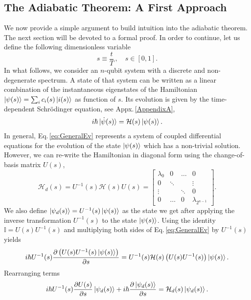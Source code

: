 \subsection{The Adiabatic Theorem: A First Approach}
We now provide a simple argument to build intuition into the adiabatic theorem. The next section will be devoted to a formal proof. In order to continue, let us define the following dimensionless variable
\begin{equation}
    s \equiv \frac{t}{T}\, , \quad s \in [0,1].
\end{equation}
In what follows, we consider an $n$-qubit system with a discrete and non-degenerate spectrum. A state of that system can be written as a linear combination of the instantaneous eigenstates of the Hamiltonian $\ket{\psi(s)} = \sum_{i}c_{i}(s)\ket{i(s)}$ as function of $s$. Its evolution is given by the time-dependent Schrödinger equation, see Appx.\,\ref{AppendixA},
\begin{equation}
\label{eq:GeneralEv}
    i\hbar \ket{\dot{\psi}(s)} = \mathcal{H}(s) \ket{\psi(s)}.
\end{equation}
In general, Eq.\,\eqref{eq:GeneralEv} represents a system of coupled differential equations for the evolution of the state $\ket{\psi(s)}$ which has a non-trivial solution. However, we can re-write the Hamiltonian in diagonal form using the change-of-basis matrix $U(s)$,
\begin{equation}
    \mathcal{H}_{d}(s) = U^{-1}(s)\mathcal{H}(s)U(s) = \begin{bmatrix}
           \lambda_{0} & 0 & \hdots & 0 \\
           0 &  \ddots & & \vdots \\
           \vdots &   & \ddots & 0 \\
           0 & \hdots & 0 & \lambda_{2^{n-1}}
         \end{bmatrix}.
\end{equation}
We also define $\ket{\psi_{d}(s)} = U^{-1}(s)\ket{\psi(s)}$ as the state we get after applying the inverse transformation $U^{-1}(s)$ to the state $\ket{\psi(s)}$. Using the identity $\mathbb{I} = U(s)U^{-1}(s)$ and multiplying both sides of Eq.\,\eqref{eq:GeneralEv} by $U^{-1}(s)$ yields
\begin{equation}
     i\hbar U^{-1}(s) \frac{\partial \left(U(s)U^{-1}(s)\ket{\psi(s)}\right)}{\partial s} = U^{-1}(s)\mathcal{H}(s) \left(U(s)U^{-1}(s)\right)\ket{\psi(s)}.
\end{equation}
Rearranging terms
\begin{equation}
     i\hbar U^{-1}(s) \frac{\partial U(s)}{\partial s}\ket{\psi_{d}(s)} + i\hbar  \frac{\partial \ket{\psi_{d}(s)}}{\partial s}= \mathcal{H}_{d}(s)\ket{\psi_{d}(s)}.
\end{equation}
